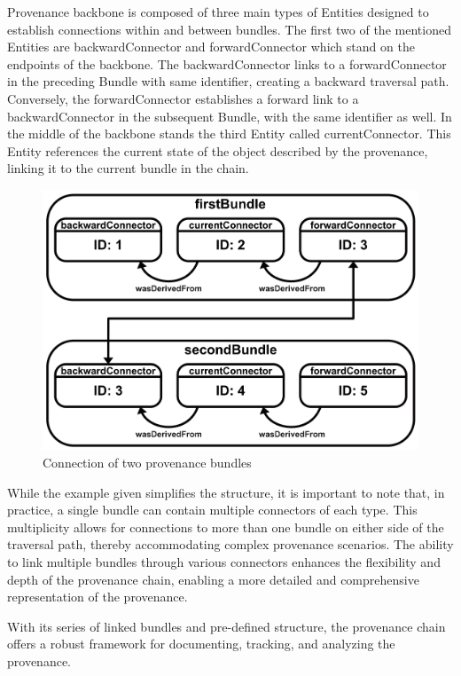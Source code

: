 \documentclass[
  digital,     %
  oneside,     %
  nosansbold,  %
  nocolorbold, %
  lof,         %
  lot,         %
]{fithesis4}
\begin{document}
Provenance backbone is composed of three main types of Entities designed to establish connections within and between bundles. The first two of the mentioned Entities are backwardConnector and forwardConnector which stand on the endpoints of the backbone. The backwardConnector links to a forwardConnector in the preceding Bundle with same identifier, creating a backward traversal path. Conversely, the forwardConnector establishes a forward link to a backwardConnector in the subsequent Bundle, with the same identifier as well. In the middle of the backbone stands the third Entity called currentConnector. This Entity references the current state of the object described by the provenance, linking it to the current bundle in the chain.

\begin{figure}[htbp]
  \begin{center}
    \includegraphics[width=12.5cm]{fithesis/images/bundleconnection.png}
  \end{center}
  \caption{Connection of two provenance bundles}
  \label{fig:bundleconnection}
\end{figure}

While the example given simplifies the structure, it is important to note that, in practice, a single bundle can contain multiple connectors of each type. This multiplicity allows for connections to more than one bundle on either side of the traversal path, thereby accommodating complex provenance scenarios. The ability to link multiple bundles through various connectors enhances the flexibility and depth of the provenance chain, enabling a more detailed and comprehensive representation of the provenance.

With its series of linked bundles and pre-defined structure, the provenance chain offers a robust framework for documenting, tracking, and analyzing the provenance.
\shorthandon{-}
\end{document}
